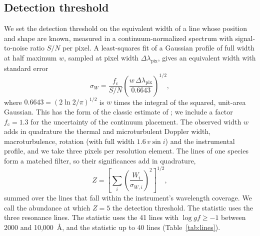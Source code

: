 \documentclass[final,5p]{elsarticle}
\begin{document}
\subsection{Detection threshold}
\label{sec:threshold}

We set the detection threshold on the equivalent width of a line whose position and shape are known, measured in a continuum-normalized spectrum with signal-to-noise ratio $S/N$ per pixel. A least-squares fit of a Gaussian profile of full width at half maximum $w$, sampled at pixel width $\Delta\lambda_\mathrm{pix}$, gives an equivalent width with standard error
\begin{equation}
\sigma_W = \frac{f_\mathrm{c}}{S/N} \left( \frac{w \, \Delta\lambda_\mathrm{pix}}{0.6643} \right)^{1/2} ,
\label{eq:sigmaw}
\end{equation}
where $0.6643 = (2\ln 2/\pi)^{1/2}$ is $w$ times the integral of the squared, unit-area Gaussian. This has the form of the classic estimate of \citet{Cayrel1988}; we include a factor $f_\mathrm{c} = 1.3$ for the uncertainty of the continuum placement. The observed width $w$ adds in quadrature the thermal and microturbulent Doppler width, macroturbulence, rotation (with full width $1.6\,v\sin i$) and the instrumental profile, and we take three pixels per resolution element. The lines of one species form a matched filter, so their significances add in quadrature,
\begin{equation}
Z = \left[ \sum_i \left( \frac{W_i}{\sigma_{W,i}} \right)^2 \right]^{1/2} ,
\label{eq:z}
\end{equation}
summed over the lines that fall within the instrument's wavelength coverage. We call the abundance at which $Z = 5$ the detection threshold. The  statistic uses the three resonance lines. The  statistic uses the 41 lines with $\log gf \geq -1$ between 2000 and 10{,}000~\AA, and the  statistic up to 40 lines (Table~\ref{tab:lines}).
\end{document}
